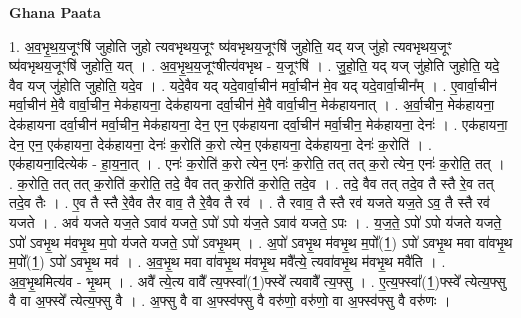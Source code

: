 \documentclass[17pt]{extarticle}
\begin{document}
\textbf{Ghana Paata } \newline

1. अ॒व॒भृ॒थ॒य॒जूꣳषि॑ जुहोति जुहो त्यवभृथय॒जूꣳ ष्य॑वभृथय॒जूꣳषि॑ जुहोति॒ यद् यज् जु॑हो
त्यवभृथय॒जूꣳ ष्य॑वभृथय॒जूꣳषि॑ जुहोति॒ यत् । . अ॒व॒भृ॒थ॒य॒जूꣳषीत्य॑वभृथ - य॒जूꣳषि॑ । . जु॒हो॒ति॒ यद् यज् जु॑होति जुहोति॒ यदे॒ वैव यज् जु॑होति जुहोति॒ यदे॒व । . यदे॒वैव यद् यदे॒वार्वा॒चीन॑ मर्वा॒चीन॑ मे॒व यद् यदे॒वार्वा॒चीन᳚म् । . ए॒वार्वा॒चीन॑ मर्वा॒चीन॑ मे॒वै वार्वा॒चीन॒ मेक॑हायना॒ देक॑हायना दर्वा॒चीन॑ मे॒वै वार्वा॒चीन॒ मेक॑हायनात् । . अ॒र्वा॒चीन॒ मेक॑हायना॒ देक॑हायना दर्वा॒चीन॑ मर्वा॒चीन॒ मेक॑हायना॒ देन॒ एन॒ एक॑हायना दर्वा॒चीन॑ मर्वा॒चीन॒ मेक॑हायना॒ देनः॑ । . एक॑हायना॒ देन॒ एन॒ एक॑हायना॒ देक॑हायना॒ देनः॑ क॒रोति॑ क॒रो त्येन॒ एक॑हायना॒ देक॑हायना॒ देनः॑ क॒रोति॑ । . एक॑हायना॒दित्येक॑ - हा॒य॒ना॒त् । . एनः॑ क॒रोति॑ क॒रो त्येन॒ एनः॑ क॒रोति॒ तत् तत् क॒रो त्येन॒ एनः॑ क॒रोति॒ तत् । . क॒रोति॒ तत् तत् क॒रोति॑ क॒रोति॒ तदे॒ वैव तत् क॒रोति॑ क॒रोति॒ तदे॒व । . तदे॒ वैव तत् तदे॒व तै स्तै रे॒व तत् तदे॒व तैः । . ए॒व तै स्तै रे॒वैव तैर वाव॒ तै रे॒वैव तै रव॑ । . तै रवाव॒ तै स्तै रव॑ यजते यज॒ते ऽव॒ तै स्तै रव॑ यजते । . अव॑ यजते यज॒ते ऽवाव॑ यजते॒ ऽपो॑ ऽपो य॑ज॒ते ऽवाव॑ यजते॒ ऽपः । . य॒ज॒ते॒ ऽपो॑ ऽपो य॑जते यजते॒ ऽपो॑ ऽवभृ॒थ म॑वभृ॒थ म॒पो य॑जते यजते॒ ऽपो॑ ऽवभृ॒थम् । . अ॒पो॑ ऽवभृ॒थ म॑वभृ॒थ म॒पो᳚(1॒) ऽपो॑ ऽवभृ॒थ मवा वा॑वभृ॒थ म॒पो᳚(1॒) ऽपो॑ ऽवभृ॒थ मव॑ । . अ॒व॒भृ॒थ मवा वा॑वभृ॒थ म॑वभृ॒थ मवै᳚त्ये॒ त्यवा॑वभृ॒थ म॑वभृ॒थ मवै॑ति । . अ॒व॒भृ॒थमित्य॑व - भृ॒थम् । . अवै᳚ त्ये॒त्य वावै᳚ त्य॒फ्स्वा᳚(1॒)फ्स्वे᳚ त्यवावै᳚ त्य॒फ्सु । . ए॒त्य॒फ्स्वा᳚(1॒)फ्स्वे᳚ त्येत्य॒फ्सु वै वा अ॒फ्स्वे᳚ त्येत्य॒फ्सु वै । . अ॒फ्सु वै वा अ॒फ्स्व॑फ्सु वै वरु॑णो॒ वरु॑णो॒ वा अ॒फ्स्व॑फ्सु वै वरु॑णः । \newline
\end{document}
